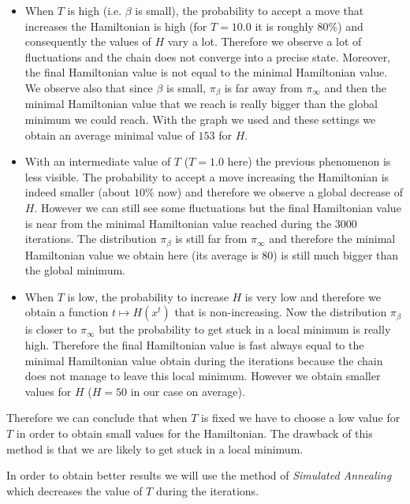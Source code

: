 \documentclass[a4paper]{article}
\begin{document}
\begin{itemize}
\item When $T$ is high (i.e. $\beta$ is small), the probability to accept a move that increases the Hamiltonian is high (for $T=10.0$ it is roughly $80\%$) and consequently the values of $H$ vary a lot. Therefore we observe a lot of fluctuations and the chain does not converge into a precise state. Moreover, the final Hamiltonian value is not equal to the minimal Hamiltonian value. We observe also that since $\beta$ is small, $\pi_{\beta}$ is far away from $\pi_{\infty}$ and then the minimal Hamiltonian value that we reach is really bigger than the global minimum we could reach. With the graph we used and these settings we obtain an average minimal value of $153$ for $H$.
\item With an intermediate value of $T$ ($T=1.0$ here) the previous phenomenon is less visible. The probability to accept a move increasing the Hamiltonian is indeed smaller (about $10\%$ now) and therefore we observe a global decrease of $H$. However we can still see some fluctuations but the final Hamiltonian value is near from the minimal Hamiltonian value reached during the $3000$ iterations. The distribution $\pi_{\beta}$ is still far from $\pi_{\infty}$ and therefore the minimal Hamiltonian value we obtain here (its average is $80$) is still much bigger than the global minimum.
\item When $T$ is low, the probability to increase $H$ is very low and therefore we obtain a function $t \mapsto H(x^t)$ that is non-increasing. Now the distribution $\pi_{\beta}$ is closer to $\pi_{\infty}$ but the probability to get stuck in a local minimum is really high. Therefore the final Hamiltonian value is fast always equal to the minimal Hamiltonian value obtain during the iterations because the chain does not manage to leave this local minimum. However we obtain smaller values for $H$ ($H=50$ in our case on average).
\end{itemize}

Therefore we can conclude that when $T$ is fixed we have to choose a low value for $T$ in order to obtain small values for the Hamiltonian. The drawback of this method is that we are likely to get stuck in a local minimum.

In order to obtain better results we will use the method of \textit{Simulated Annealing} which decreases the value of $T$ during the iterations.
\end{document}
